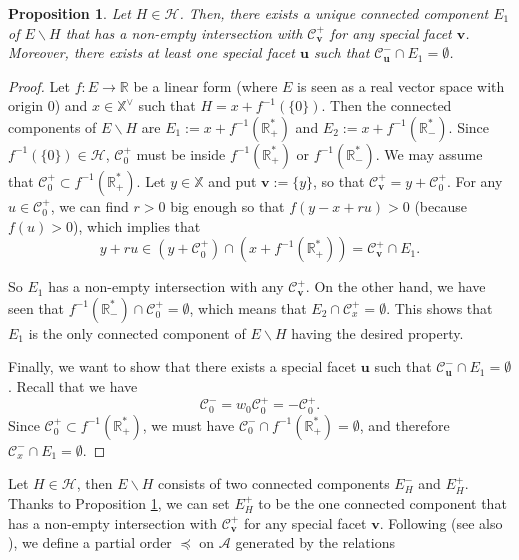 \documentclass[11pt]{amsart}
\theoremstyle{plain}
\newtheorem{prop}[thm]{Proposition}
\theoremstyle{remark}
\numberwithin{equation}{section}
\begin{document}
	\begin{prop}\label{conncomp}
		Let $H\in\mathscr{H}$. Then, there exists a unique connected component $E_1$ of $E\backslash H$ that has a non-empty intersection with $\mathscr{C}^+_\mathbf{v}$ for any special facet $\mathbf{v}$. Moreover, there exists at least one special facet $\mathbf{u}$ such that $\mathscr{C}^-_\mathbf{u}\cap E_1=\emptyset$.
	\end{prop}
	\begin{proof}
		Let $f:E\to \mathbb{R}$ be a linear form (where $E$ is seen as a real vector space with origin $0$) and $x\in \mathbb{X}^\vee$ such that $H=x+f^{-1}(\{0\})$. Then the connected components of $E\backslash H$ are $E_1:=x+f^{-1}(\mathbb{R}^*_+)$ and $E_2:=x+f^{-1}(\mathbb{R}^*_-)$. Since $f^{-1}(\{0\})\in\mathscr{H}$, $\mathscr{C}^+_0$ must be inside $f^{-1}(\mathbb{R}^*_+)$ or $f^{-1}(\mathbb{R}^*_-)$. We may assume that $\mathscr{C}^+_0\subset f^{-1}(\mathbb{R}^*_+)$. Let $y\in \mathbb{X}$ and put $\mathbf{v}:=\{y\}$, so that $\mathscr{C}^+_\mathbf{v}=y+\mathscr{C}^+_0$. For any $u\in\mathscr{C}^+_0$, we can find $r>0$ big enough so that $f(y-x+ru)>0$ (because $f(u)>0$), which implies that 
		$$y+ru\in (y+\mathscr{C}^+_0)\cap(x+f^{-1}(\mathbb{R}^*_+))=\mathscr{C}^+_\mathbf{v}\cap E_1.$$
		
		So $E_1$ has a non-empty intersection with any $\mathscr{C}^+_\mathbf{v}$. On the other hand, we have seen that $f^{-1}(\mathbb{R}^*_-)\cap \mathscr{C}^+_0=\emptyset$, which means that $E_2\cap \mathscr{C}^+_{x}=\emptyset$. This shows that $E_1$ is the only connected component of $E\backslash H$ having the desired property.
		
		Finally, we want to show that there exists a special facet $\mathbf{u}$ such that $\mathscr{C}^-_\mathbf{u}\cap E_1=\emptyset$. Recall that we have 
		$$\mathscr{C}^-_0=w_0\mathscr{C}^+_0=-\mathscr{C}^+_0.$$
		Since $\mathscr{C}^+_0\subset f^{-1}(\mathbb{R}^*_+)$, we must have $\mathscr{C}^-_0\cap f^{-1}(\mathbb{R}^*_+)=\emptyset$, and therefore $\mathscr{C}^-_x\cap E_1=\emptyset$.
	\end{proof}
	Let $H\in\mathscr{H}$, then $E\backslash H$ consists of two connected components $E^-_H$ and $E^+_H$. Thanks to Proposition \ref{conncomp}, we can set $E^+_H$ to be the one connected component that has a non-empty intersection with $\mathscr{C}^+_\mathbf{v}$ for any special facet $\mathbf{v}$. Following \cite[§4]{Soergel1997KazhdanLusztigPA} (see also \cite[§1.5]{LUSZTIG1980121}), we define a partial order $\preceq$ on $\mathcal{A}$ generated by the relations
\end{document}
